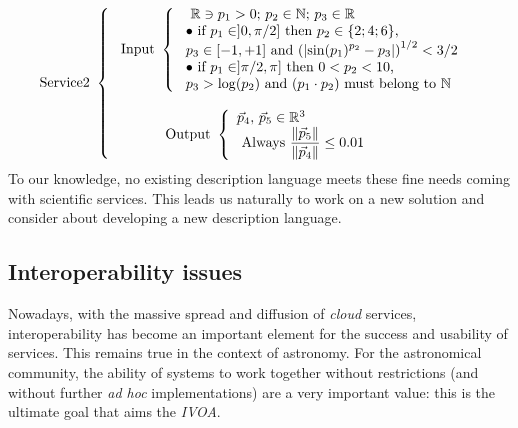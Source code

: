 \documentclass[a4paper,11pt] {article}
\begin{document}
\begin{equation}
\mbox{Service2 } \left\{
\begin{array}{l}
\ \mbox{Input } \left\{
\begin{array}{l}
\ \mbox{ $\mathbb R \ni p_1 >0$; $p_2 \in \mathbb N$; $p_3 \in \mathbb R$} \\
\  \bullet \mbox{ if $p_1 \in ]0,\pi/2]$ then $p_2 \in \{2;4;6\}$,}\\
\ \mbox{$p_3 \in [-1,+1]$ and $\displaystyle \left( \left|  \sin(p_1)^{p_2} -p_3 \right| \right)^{1/2}<3/2$ } \\
\ \bullet \mbox{ if $p_1 \in ]\pi/2,\pi]$ then $0<p_2 < 10$,}\\
\ \mbox{$p_3>\log(p_2)$ and $(p_1 \cdot p_2)$ must belong to $\mathbb N$} \\
\end{array}
\right. \\
\\
\ \mbox{\hspace{1cm} Output } \left\{
\begin{array}{l}
 \mbox{$\vec p_4, \, \vec p_5 \in \mathbb R^3$ } \\
 \ \mbox{Always $\displaystyle \frac{\| \vec p_5\|}{\|\vec p_4 \|} \leq 0.01 $} \\
 \end{array}
\right.\\
\end{array}
\right.
\end{equation}
To our knowledge, no existing description language meets these fine needs coming with scientific
services. This leads us naturally to work on a new solution and consider about developing a new
description language.

\subsection{Interoperability issues}
Nowadays, with the massive spread and diffusion of {\it cloud} services, interoperability has become
an important element for the success and usability of services. This remains true in the context of
astronomy.
For the astronomical community, the ability of systems to work together without restrictions (and
without further {\it ad hoc} implementations) are a very important value: this is the ultimate goal
that aims the {\it IVOA}.\\
\end{document}
